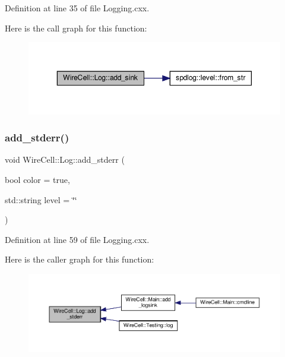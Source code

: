 Definition at line 35 of file Logging.\+cxx.

Here is the call graph for this function\+:
\nopagebreak
\begin{figure}[H]
\begin{center}
\leavevmode
\includegraphics[width=350pt]{namespace_wire_cell_1_1_log_adbf98ba02ee62812b211ede24464c91c_cgraph}
\end{center}
\end{figure}
\mbox{\label{namespace_wire_cell_1_1_log_a01ca295ba785cd50c408dc064404949c}} 
\subsubsection{\texorpdfstring{add\+\_\+stderr()}{add\_stderr()}}
{\footnotesize\ttfamily void Wire\+Cell\+::\+Log\+::add\+\_\+stderr (\begin{DoxyParamCaption}\item[{bool}]{color = {\ttfamily true},  }\item[{std\+::string}]{level = {\ttfamily \char`\"{}\char`\"{}} }\end{DoxyParamCaption})}



Definition at line 59 of file Logging.\+cxx.

Here is the caller graph for this function\+:
\nopagebreak
\begin{figure}[H]
\begin{center}
\leavevmode
\includegraphics[width=350pt]{namespace_wire_cell_1_1_log_a01ca295ba785cd50c408dc064404949c_icgraph}
\end{center}
\end{figure}
\mbox{\label{namespace_wire_cell_1_1_log_a417843ceafbe08958ee4d72acf1732d0}} 
